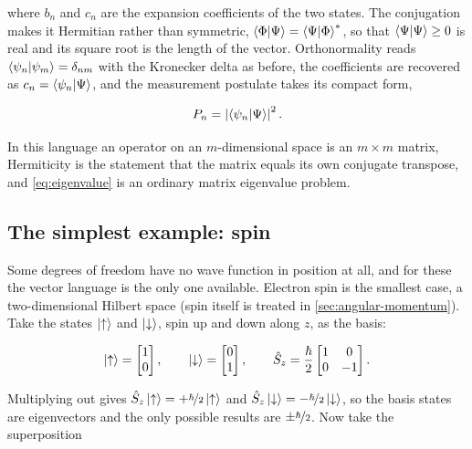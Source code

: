         where $b_{n}$ and $c_{n}$ are the expansion coefficients of the two states. The conjugation makes it Hermitian rather than symmetric, $\braket{\Phi|\Psi} = \braket{\Psi|\Phi}^{*}$, so that $\braket{\Psi|\Psi} \ge 0$ is real and its square root is the length of the vector. Orthonormality reads $\braket{\psi_{n}|\psi_{m}} = \delta_{nm}$ with the Kronecker delta as before, the coefficients are recovered as $c_{n} = \braket{\psi_{n}|\Psi}$, and the measurement postulate takes its compact form,

        \begin{equation}\label{eq:born-amplitude}
            P_{n} = \left|\braket{\psi_{n}|\Psi}\right|^{2}.
        \end{equation}

        In this language an operator on an $m$-dimensional space is an $m \times m$ matrix, Hermiticity is the statement that the matrix equals its own conjugate transpose, and \cref{eq:eigenvalue} is an ordinary matrix eigenvalue problem.

    \subsection{The simplest example: spin}

        Some degrees of freedom have no wave function in position at all, and for these the vector language is the only one available. Electron spin is the smallest case, a two-dimensional Hilbert space (spin itself is treated in \cref{sec:angular-momentum}). Take the states $\ket{\uparrow}$ and $\ket{\downarrow}$, spin up and down along $z$, as the basis:

        \begin{equation*}
            \ket{\uparrow} = \begin{bmatrix} 1 \\ 0 \end{bmatrix}, \qquad
            \ket{\downarrow} = \begin{bmatrix} 0 \\ 1 \end{bmatrix}, \qquad
            \hat{S}_{z} = \frac{\hbar}{2}\begin{bmatrix} 1 & 0 \\ 0 & -1 \end{bmatrix}.
        \end{equation*}

        Multiplying out gives $\hat{S}_{z}\ket{\uparrow} = +\nicefrac{\hbar}{2}\ket{\uparrow}$ and $\hat{S}_{z}\ket{\downarrow} = -\nicefrac{\hbar}{2}\ket{\downarrow}$, so the basis states are eigenvectors and the only possible results are $\pm\nicefrac{\hbar}{2}$. Now take the superposition

